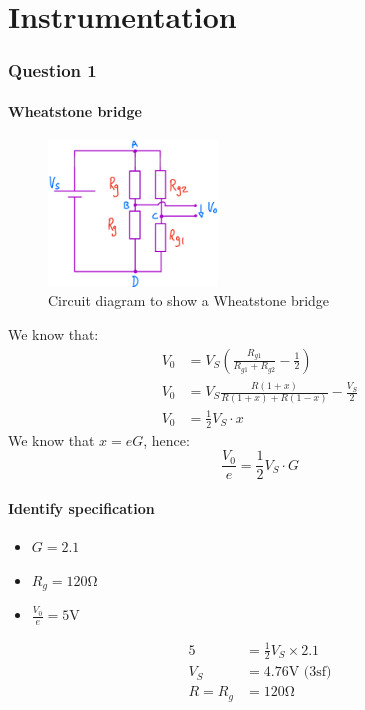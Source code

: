 \documentclass[12pt]{article}
\numberwithin{equation}{section}
\begin{document}
\part{Instrumentation}
\section{Question 1}
\subsection*{Wheatstone bridge}
\begin{figure}[H]
  \centering
  \includegraphics[width=0.4\textwidth]{./img/4-1circuit.png}
  \caption{Circuit diagram to show a Wheatstone bridge}
\end{figure}
We know that:
\begin{align}
  V_0 &= V_S \left( \frac{R_{g1}}{R_{g1} + R_{g2}} - \frac{1}{2} \right)\\
  V_0 &= V_S \frac{R(1+x)}{R(1+x) + R(1-x)} - \frac{V_S}{2}\\
  V_0 &= \frac{1}{2} V_S \cdot x
\end{align}
We know that $x = eG$, hence:
\begin{equation}
  \frac{V_0}{e} = \frac{1}{2}V_S \cdot G
\end{equation}
\subsection*{Identify specification}
\begin{itemize}
  \item $G = 2.1$
  \item $R_g = 120\si{\ohm}$
  \item $\frac{V_0}{e} = 5\si{\volt}$
\end{itemize}
\begin{align}
  5 &= \frac{1}{2} V_S \times 2.1\\
  V_S &= 4.76 \si{\volt} \textrm{ (3sf)}\\
  R = R_g &= 120\si{\ohm}
\end{align}
\end{document}
